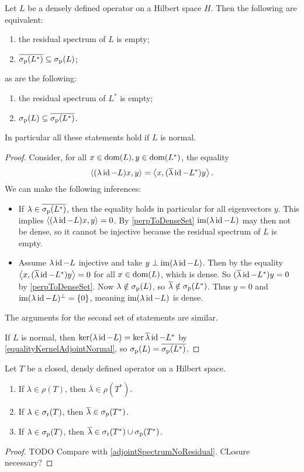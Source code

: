 \begin{proposition} \label{adjointSpectrumNoResidual}
Let $L$ be a densely defined operator on a Hilbert space $H$. Then the following are equivalent:
\begin{enumerate}
\item the residual spectrum of $L$ is empty;
\item $\overline{\sigma_\text{p}(L^*)} \subseteq \sigma_\text{p}(L)$;
\end{enumerate}
as are the following:
\begin{enumerate}
\item the residual spectrum of $L^*$ is empty;
\item $\sigma_\text{p}(L) \subseteq \overline{\sigma_\text{p}(L^*)}$.
\end{enumerate}
In particular all these statements hold if $L$ is normal.
\end{proposition}
\begin{proof}
Consider, for all $x\in \operatorname{dom}(L), y\in\operatorname{dom}(L^*)$, the equality
\[ \left\langle (\lambda\operatorname{id}-L)x,y \right\rangle = \left\langle x,(\overline{\lambda}\operatorname{id}-L^*)y \right\rangle. \]
We can make the following inferences:
\begin{itemize}
\item If $\lambda\in \overline{\sigma_\text{p}(L^*)}$, then the equality holds in particular for all eigenvectors $y$. This implies $\left\langle (\lambda\operatorname{id}-L)x,y \right\rangle = 0$. By \ref{perpToDenseSet} $\operatorname{im}(\lambda\operatorname{id}-L)$ may then not be dense, so it cannot be injective because the residual spectrum of $L$ is empty.
\item Assume $\lambda\operatorname{id}-L$ injective and take  $y\perp \operatorname{im}(\lambda\operatorname{id}-L)$. Then by the equality $\left\langle x, (\overline{\lambda}\operatorname{id} - L^*)y \right\rangle = 0$ for all $x\in\operatorname{dom}(L)$, which is dense. So $(\overline{\lambda}\operatorname{id} - L^*)y = 0$ by \ref{perpToDenseSet}. Now $\lambda\notin \sigma_\text{p}(L)$, so $\overline{\lambda}\notin \sigma_\text{p}(L^*)$. Thus $y = 0$ and $\operatorname{im}(\lambda\operatorname{id}-L)^\perp = \{0\}$, meaning $\operatorname{im}(\lambda\operatorname{id}-L)$ is dense.
\end{itemize}
The arguments for the second set of statements are similar.

If $L$ is normal, then $\ker(\lambda \operatorname{id} - L) = \ker{\overline{\lambda}\operatorname{id}-L^*}$ by \ref{equalityKernelAdjointNormal}, so $\sigma_\text{p}(L) = \overline{\sigma_\text{p}(L^*)}$.
\end{proof}

\begin{proposition}
Let $T$ be a closed, densly defined operator on a Hilbert space.
\begin{enumerate}
\item If $\lambda\in\rho(T)$, then $\overline{\lambda}\in\rho(T^*)$.
\item If $\lambda\in\sigma_\text{r}(T)$, then $\overline{\lambda}\in\sigma_\text{p}(T^*)$.
\item If $\lambda\in\sigma_\text{p}(T)$, then $\overline{\lambda}\in\sigma_\text{r}(T^*)\cup\sigma_\text{p}(T^*)$.
\end{enumerate}
\end{proposition}
\begin{proof}
TODO Compare with \ref{adjointSpectrumNoResidual}. CLosure necessary?
\end{proof}


